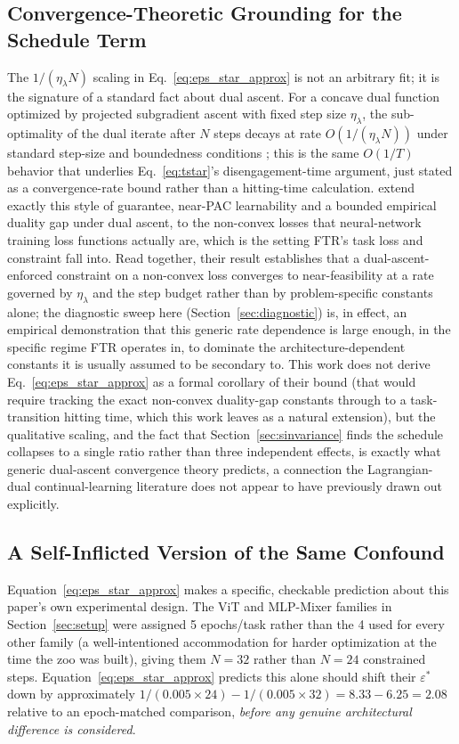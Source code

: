 \documentclass[11pt]{article}
\newcommand{\eps}{\varepsilon}
\newcommand{\epsstar}{\eps^{*}}
\begin{document}
\subsection{Convergence-Theoretic Grounding for the Schedule Term}
\label{sec:theory-grounding}
The $1/(\eta_\lambda N)$ scaling in Eq.~\ref{eq:eps_star_approx} is not an
arbitrary fit; it is the signature of a standard fact about dual ascent.
For a concave dual function optimized by projected subgradient ascent with
fixed step size $\eta_\lambda$, the sub-optimality of the dual iterate after
$N$ steps decays at rate $O(1/(\eta_\lambda N))$ under standard step-size and
boundedness conditions \citep{boyd2004convex,nedic2009subgradient}; this is
the same $O(1/T)$ behavior that underlies Eq.~\ref{eq:tstar}'s
disengagement-time argument, just stated as a convergence-rate bound rather
than a hitting-time calculation. \citet{chamon2023constrained} extend
exactly this style of guarantee, near-PAC learnability and a bounded
empirical duality gap under dual ascent, to the non-convex losses that
neural-network training loss functions actually are, which is the setting
FTR's task loss and constraint fall into. Read together, their result
establishes that a dual-ascent-enforced constraint on a non-convex loss
converges to near-feasibility at a rate governed by $\eta_\lambda$ and the
step budget rather than by problem-specific constants alone; the diagnostic
sweep here (Section~\ref{sec:diagnostic}) is, in effect, an empirical
demonstration that this generic rate dependence is large enough, in the
specific regime FTR operates in, to dominate the architecture-dependent
constants it is usually assumed to be secondary to. This work does not derive
Eq.~\ref{eq:eps_star_approx} as a formal corollary of their bound (that
would require tracking the exact non-convex duality-gap constants through
to a task-transition hitting time, which this work leaves as a natural extension),
but the qualitative scaling, and the fact that Section~\ref{sec:sinvariance}
finds the schedule collapses to a single ratio rather than three independent
effects, is exactly what generic dual-ascent convergence theory predicts,
a connection the Lagrangian-dual continual-learning
literature does not appear to have previously drawn out explicitly.

\subsection{A Self-Inflicted Version of the Same Confound}
\label{sec:selfconfound}
Equation~\ref{eq:eps_star_approx} makes a specific, checkable prediction
about this paper's own experimental design. The ViT and MLP-Mixer families in
Section~\ref{sec:setup} were assigned 5 epochs/task rather than the 4 used
for every other family (a well-intentioned accommodation for harder
optimization at the time the zoo was built), giving them $N=32$ rather than
$N=24$ constrained steps. Equation~\ref{eq:eps_star_approx} predicts this
alone should shift their $\epsstar$ down by approximately
$1/(0.005\times24) - 1/(0.005\times32) = 8.33-6.25 = 2.08$ relative to an
epoch-matched comparison, \emph{before any genuine architectural
difference is considered}.
\end{document}
